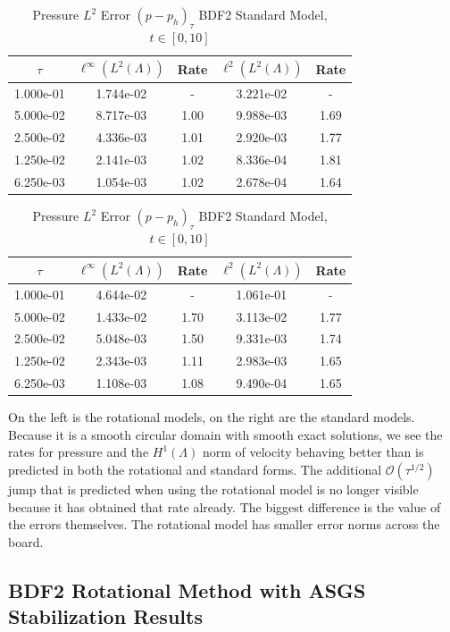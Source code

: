 \documentclass[letterpaper]{erdc}
\begin{document}
\begin{table}[h!]
  \parbox{.45\linewidth}{
  \tiny
  \centering
    \caption{Pressure $L^2$ Error $(p - p_h)_{\tau}$ BDF2 Rotational Model, $t\in[0,10]$}
    \begin{tabular}{c|c|c|c|c}
      $\tau$ &  $\ell^{\infty}\left(L^2(\Lambda)\right)$ &  Rate  &  $\ell^2\left(L^2(\Lambda)\right)$  &  Rate\\
      \hline
      1.000e-01 & 1.744e-02 &   -  & 3.221e-02 &   - \\
      5.000e-02 & 8.717e-03 & 1.00 & 9.988e-03 & 1.69\\
      2.500e-02 & 4.336e-03 & 1.01 & 2.920e-03 & 1.77\\
      1.250e-02 & 2.141e-03 & 1.02 & 8.336e-04 & 1.81\\
      6.250e-03 & 1.054e-03 & 1.02 & 2.678e-04 & 1.64
    \end{tabular}
    }
    \hfill
    \parbox{.45\linewidth}{
    \tiny
    \centering
      \caption{Pressure $L^2$ Error $(p - p_h)_{\tau}$ BDF2 Standard Model, $t\in[0,10]$}
      \begin{tabular}{c|c|c|c|c}
        $\tau$ &  $\ell^{\infty}\left(L^2(\Lambda)\right)$ &  Rate  &  $\ell^2\left(L^2(\Lambda)\right)$  &  Rate\\
        \hline
        1.000e-01 & 4.644e-02 &   -  & 1.061e-01 &   - \\
        5.000e-02 & 1.433e-02 & 1.70 & 3.113e-02 & 1.77\\
        2.500e-02 & 5.048e-03 & 1.50 & 9.331e-03 & 1.74\\
        1.250e-02 & 2.343e-03 & 1.11 & 2.983e-03 & 1.65\\
        6.250e-03 & 1.108e-03 & 1.08 & 9.490e-04 & 1.65
      \end{tabular}
    }
\end{table}


On the left is the rotational models, on the right are the standard models.
Because it is a smooth circular domain with smooth exact solutions, we see the
rates for pressure and the $H^1(\Lambda)$ norm of velocity behaving better than
is predicted in both the rotational and standard forms.  The additional
$\mathcal{O}(\tau^{1/2})$ jump that is predicted when using the rotational
model is no longer visible because it has obtained that rate already.  The
biggest difference is the value of the errors themselves.  The rotational model
has smaller error norms across the board.


%
%
\subsection{BDF2 Rotational Method with ASGS Stabilization Results}
\end{document}

